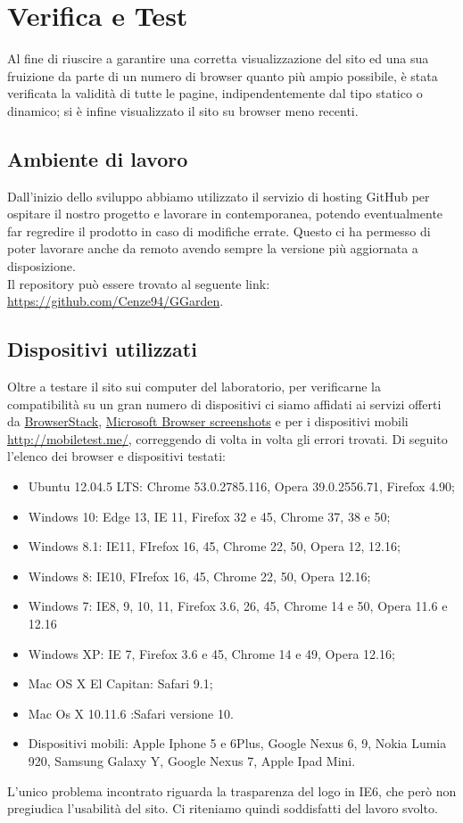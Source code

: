 \section{Verifica e Test}{
	Al fine di riuscire a garantire una corretta visualizzazione del sito ed una sua fruizione da parte di un numero di browser quanto più ampio possibile, è stata verificata la validità di tutte le pagine, indipendentemente dal tipo statico o dinamico; si è infine visualizzato il sito su browser meno recenti.
	\subsection{Ambiente di lavoro}{
		Dall'inizio dello sviluppo abbiamo utilizzato il servizio di hosting GitHub per ospitare il nostro progetto e lavorare in contemporanea, potendo eventualmente far regredire il prodotto in caso di modifiche errate. Questo ci ha permesso di poter lavorare anche da remoto avendo sempre la versione più aggiornata a disposizione.\\
		Il repository può essere trovato al seguente link: \url{https://github.com/Cenze94/GGarden}.
	}
	\subsection{Dispositivi utilizzati}{
		Oltre a testare il sito sui computer del laboratorio, per verificarne la compatibilità su un gran numero di dispositivi ci siamo affidati ai servizi offerti da \href{https://www.browserstack.com/screenshots}{BrowserStack}, \href{https://developer.microsoft.com/en-us/microsoft-edge/tools/screenshots/}{Microsoft Browser screenshots} e per i dispositivi mobili \url{http://mobiletest.me/}, correggendo di volta in volta gli errori trovati.  Di seguito l'elenco dei browser e dispositivi testati:
		\begin{itemize}\itemsep1pt
			\item Ubuntu 12.04.5 LTS: Chrome 53.0.2785.116, Opera 39.0.2556.71, Firefox 4.90;
			\item Windows 10: Edge 13, IE 11, Firefox 32 e 45, Chrome 37, 38 e 50;
			\item Windows 8.1: IE11, FIrefox 16, 45, Chrome 22, 50, Opera 12, 12.16;
			\item Windows 8: IE10, FIrefox 16, 45, Chrome 22, 50, Opera 12.16;
			\item Windows 7: IE8, 9, 10, 11, Firefox 3.6, 26, 45, Chrome 14 e 50, Opera 11.6 e 12.16
			\item Windows XP: IE 7, Firefox 3.6 e 45, Chrome 14 e 49, Opera 12.16;
			\item Mac OS X El Capitan: Safari 9.1;
			\item Mac Os X 10.11.6 :Safari versione 10.
			\item Dispositivi mobili: Apple Iphone 5 e 6Plus, Google Nexus 6, 9, Nokia Lumia 920, Samsung Galaxy Y, Google Nexus 7, Apple Ipad Mini.
		\end{itemize}
		L'unico problema incontrato riguarda la trasparenza del logo in IE6, che però non pregiudica l'usabilità del sito. Ci riteniamo quindi soddisfatti del lavoro svolto.
	}
}

